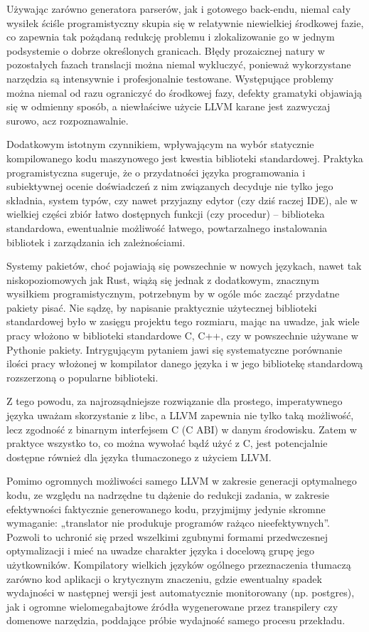 Używając zarówno generatora parserów, jak i gotowego back-endu, niemal cały wysiłek ściśle programistyczny skupia się w relatywnie niewielkiej środkowej fazie, co zapewnia tak pożądaną redukcję problemu i zlokalizowanie go w jednym podsystemie o dobrze określonych granicach. Błędy prozaicznej natury w pozostałych fazach translacji można niemal wykluczyć, ponieważ wykorzystane narzędzia są intensywnie i profesjonalnie testowane. Występujące problemy można niemal od razu ograniczyć do środkowej fazy, defekty gramatyki objawiają się w odmienny sposób, a niewłaściwe użycie LLVM karane jest zazwyczaj surowo, acz rozpoznawalnie. 

Dodatkowym istotnym czynnikiem, wpływającym na wybór statycznie kompilowanego kodu maszynowego jest kwestia biblioteki standardowej. Praktyka programistyczna sugeruje, że o przydatności języka programowania i subiektywnej ocenie doświadczeń z nim związanych decyduje nie tylko jego składnia, system typów, czy nawet przyjazny edytor (czy dziś raczej IDE), ale w wielkiej części zbiór łatwo dostępnych funkcji (czy procedur) – biblioteka standardowa, ewentualnie możliwość łatwego, powtarzalnego instalowania bibliotek i zarządzania ich zależnościami.

Systemy pakietów, choć pojawiają się powszechnie w nowych językach, nawet tak niskopoziomowych jak Rust, wiążą się jednak z dodatkowym, znacznym wysiłkiem programistycznym, potrzebnym by w ogóle móc zacząć przydatne pakiety pisać. Nie sądzę, by napisanie praktycznie użytecznej biblioteki standardowej było w zasięgu projektu tego rozmiaru, mając na uwadze, jak wiele pracy włożono w biblioteki standardowe C, C++, czy w powszechnie używane w Pythonie pakiety. Intrygującym pytaniem jawi się systematyczne porównanie ilości pracy włożonej w kompilator danego języka i w jego bibliotekę standardową rozszerzoną o popularne biblioteki.

Z tego powodu, za najrozsądniejsze rozwiązanie dla prostego, imperatywnego języka uważam skorzystanie z libc, a LLVM zapewnia nie tylko taką możliwość, lecz zgodność z binarnym interfejsem C (C ABI) w danym środowisku. Zatem w praktyce wszystko to, co można wywołać bądź użyć z C, jest potencjalnie dostępne również dla języka tłumaczonego z użyciem LLVM.

Pomimo ogromnych możliwości samego LLVM w zakresie generacji optymalnego kodu, ze względu na nadrzędne tu dążenie do redukcji zadania, w zakresie efektywności faktycznie generowanego kodu, przyjmijmy jedynie skromne wymaganie: „translator nie produkuje programów rażąco nieefektywnych”. Pozwoli to uchronić się przed wszelkimi zgubnymi formami przedwczesnej optymalizacji i mieć na uwadze charakter języka i docelową grupę jego użytkowników. Kompilatory wielkich języków ogólnego przeznaczenia tłumaczą zarówno kod aplikacji o krytycznym znaczeniu, gdzie ewentualny spadek wydajności w następnej wersji jest automatycznie monitorowany (np. postgres\cite{postgres_regression_testing}), jak i ogromne wielomegabajtowe źródła  wygenerowane przez transpilery czy domenowe narzędzia, poddające próbie wydajność samego procesu przekładu.

